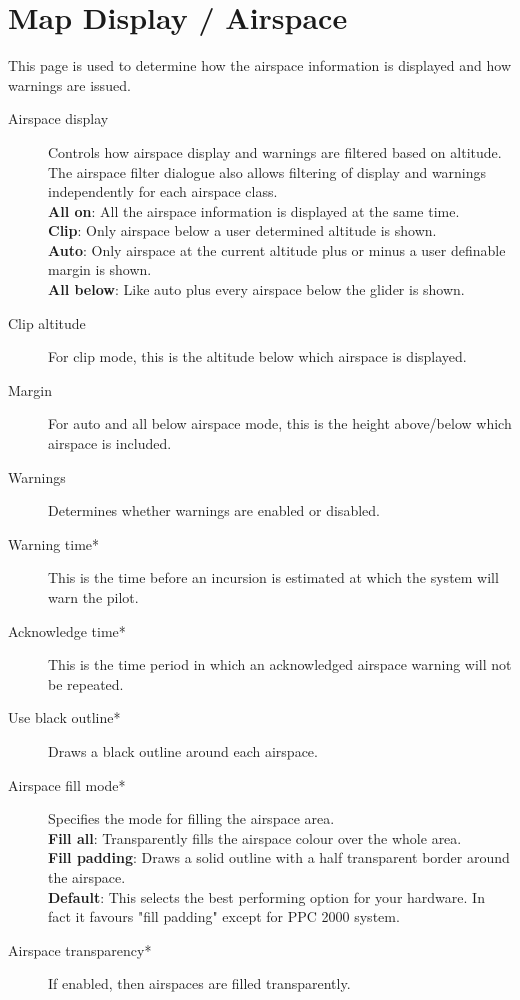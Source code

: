 \section{Map Display / Airspace}

This page is used to determine how the airspace information is
displayed and how warnings are issued.

\begin{description}
\item[Airspace display]  Controls how airspace display and warnings are filtered 
  based on altitude.  The airspace filter dialogue also allows filtering
  of display and warnings independently for each airspace class. \\
  {\bf All on}: All the airspace information is displayed at the same time. \\
  {\bf Clip}: Only airspace below a user determined altitude is shown. \\
  {\bf Auto}: Only airspace at the current altitude plus or minus a user 
    definable margin is shown. \\
  {\bf All below}:  Like auto plus every airspace below the glider is shown.
\item[Clip altitude] For clip mode, this is the altitude below which airspace 
  is displayed.
\item[Margin]  For auto and all below airspace mode, this is the height 
  above/below which airspace is included.
\item[Warnings]  Determines whether warnings are enabled or disabled.
\item[Warning time*]  This is the time before an incursion is estimated at
  which the system will warn the pilot.
\item[Acknowledge time*]  This is the time period in which an acknowledged airspace 
  warning will not be repeated.
\item[Use black outline*]  Draws a black outline around each airspace.
\item[Airspace fill mode*]  Specifies the mode for filling the airspace area. \\
  {\bf Fill all}:  Transparently fills the airspace colour over the whole area. \\
  {\bf Fill padding}: Draws a solid outline with a half transparent border 
    around the airspace. \\
  {\bf Default}:  This selects the best performing option for your hardware. In fact 
  it favours "fill padding" except for PPC 2000 system.
\item[Airspace transparency*]  If enabled, then airspaces are filled transparently.
\end{description}

